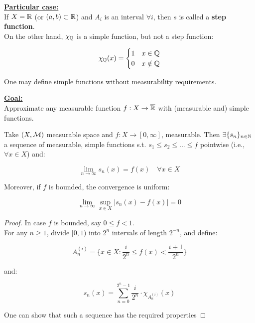\textbf{\underline{Particular case:}}\\

If $X = \mathbb{R}$ (or $(a, b) \subset \mathbb{R}$) and $A_i$ is an interval $\forall i$, 
then $s$ is called a \textbf{step function}.\\

On the other hand, $\chi_{\mathbb{Q}}$ is a simple function, but not a step function:

$$\chi_{\mathbb{Q}}(x) = \begin{cases} 1 & x \in \mathbb{Q} \\ 0 & x \notin \mathbb{Q} \end{cases}$$

\begin{fremark}
    One may define simple functions without measurability requirements. 
\end{fremark}

\vspace{1em}

\textbf{\underline{Goal:}}\\
Approximate any measurable function $f: X \to \overline{\mathbb{R}}$ with (measurable and) 
simple functions.

\begin{ftheorem}

    Take $(X, \mathcal{M})$ measurable space and $f: X \to [0, \infty]$, measurable.
    Then $\exists \{s_n\}_{n \in \mathbb{N}}$ a sequence of measurable, simple functions
    s.t. $s_1 \leq s_2 \leq ... \leq f$ pointwise (i.e., $\forall x \in X$) and:

    $$\lim_{n \to \infty} s_n(x) = f(x) \quad \forall x \in X$$

    Moreover, if $f$ is bounded, the convergence is uniform:

    $$\lim_{n \to \infty} \sup_{x \in X} |s_n(x) - f(x)| = 0$$
\end{ftheorem}

\begin{proof}
    In case $f$ is bounded, say $0 \leq f < 1$.\\ 
    
    For any $n \geq 1$, divide $[0, 1)$ into $2^{n}$ intervals of length 
    $2^{-n}$, and define:

    $$A_{n}^{(i)} = \{x \in X: \frac{i}{2^n} \leq f(x) < \frac{i + 1}{2^n}\}$$

    and:

    $$s_n(x) = \sum_{n = 0}^{2^n - 1} \frac{i}{2^n} \cdot \chi_{A_{n}^{(i)}}(x)$$

    One can show that such a sequence has the required properties
\end{proof}

